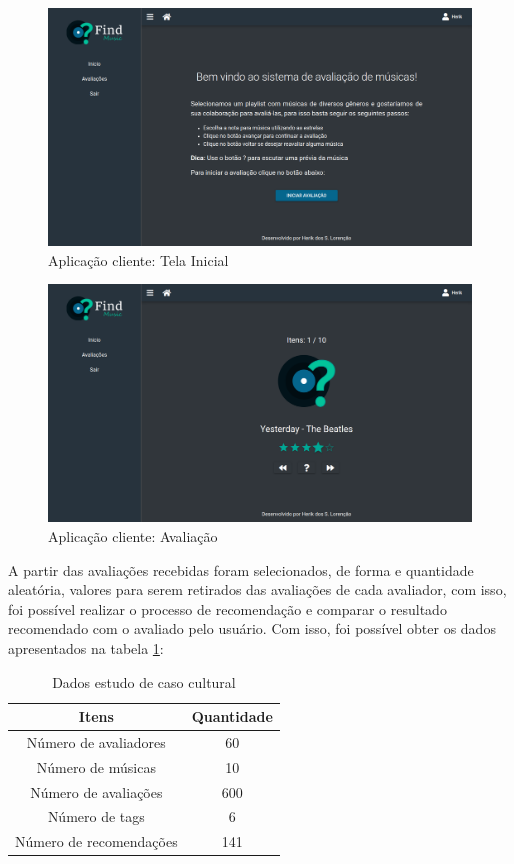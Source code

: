\begin{figure}[H]
	\centering
	\includegraphics[width=.7\linewidth]{imagens/findmusicInicio.png}
	\caption[Aplicação cliente: Tela Inicial]{Aplicação cliente: Tela Inicial}
    \label{fig:findmusicInicio}
\end{figure}

\begin{figure}[H]
	\centering
	\includegraphics[width=.7\linewidth]{imagens/findmusicAvaliacao.png}
	\caption[Aplicação cliente: Avaliação]{Aplicação cliente: Avaliação}
    \label{fig:findmusicAvaliacao}
\end{figure}

A partir das avaliações recebidas foram selecionados, de forma e quantidade aleatória, valores para serem retirados das avaliações de cada avaliador, com isso, foi possível realizar o processo de recomendação e comparar o resultado recomendado com o avaliado pelo usuário. Com isso, foi possível obter os dados apresentados na tabela \ref{tableref:dadosEstudoCasoCultural}:

\begin{table}[H]
\centering
\begin{tabular}{|c|c|}
\hline
\textbf{Itens}          & \textbf{Quantidade} \\ \hline
Número de avaliadores   & 60                  \\ \hline
Número de músicas       & 10                  \\ \hline
Número de avaliações    & 600                 \\ \hline
Número de tags          & 6                   \\ \hline
Número de recomendações & 141                  \\ \hline
\end{tabular}
\caption{Dados estudo de caso cultural}
\label{tableref:dadosEstudoCasoCultural}
\end{table}

